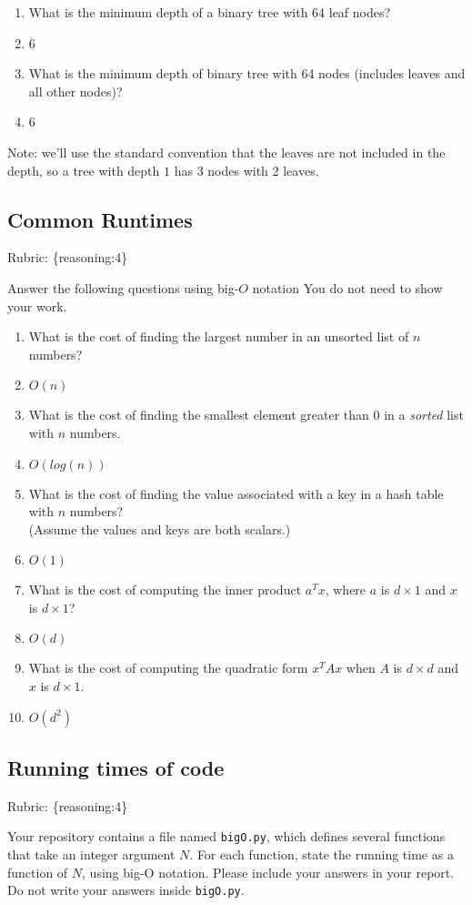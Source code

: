 \documentclass{article}
\def\rubric#1{\gre{Rubric: \{#1\}}}{}
\def\blu#1{{\color{blu}#1}}
\def\gre#1{{\color{gre}#1}}
\begin{document}
\begin{enumerate}
\item What is the minimum depth of a binary tree with 64 leaf nodes?
\item[] \gre{6}
\item What is the minimum depth of binary tree with 64 nodes (includes leaves and all other nodes)?
\item[] \gre{6}
\end{enumerate}
Note: we'll use the standard convention that the leaves are not included in the depth, so a tree with depth $1$ has 3 nodes with 2 leaves.

\subsection{Common Runtimes}
\rubric{reasoning:4}

\blu{Answer the following questions using big-$O$ notation} You do not need to show your work.
\begin{enumerate}
\item What is the cost of finding the largest number in an unsorted list of $n$ numbers?
\item[] \gre{$O(n)$}
\item What is the cost of finding the smallest element greater than 0 in a \emph{sorted} list with $n$ numbers.
\item[] \gre{$O(log(n))$}
\item What is the cost of finding the value associated with a key in a hash table with $n$ numbers? \\(Assume the values and keys are both scalars.)
\item[] \gre{$O(1)$}
\item What is the cost of computing the inner product $a^Tx$, where $a$ is $d \times 1$ and $x$ is $d \times 1$?
\item[] \gre{$O(d)$}
\item What is the cost of computing the quadratic form $x^TAx$ when $A$ is $d \times d$ and $x$ is $d \times 1$.
\item[] \gre{$O(d^2)$}
\end{enumerate}

\subsection{Running times of code}
\rubric{reasoning:4}

Your repository contains a file named \texttt{bigO.py}, which defines several functions
that take an integer argument $N$. For each function, \blu{state the running time as a function of $N$, using big-O notation}.
Please include your answers in your report. Do not write your answers inside \texttt{bigO.py}.
\end{document}
